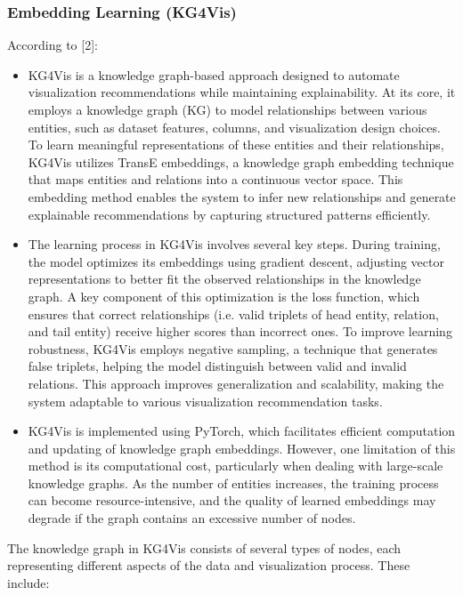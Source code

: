 \subsubsection{Embedding Learning (KG4Vis)}

According to [2]:
\begin{itemize}
\item KG4Vis is a knowledge graph-based approach designed to automate visualization recommendations while maintaining explainability. At its core, it employs a knowledge graph (KG) to model relationships between various entities, such as dataset features, columns, and visualization design choices. To learn meaningful representations of these entities and their relationships, KG4Vis utilizes TransE embeddings, a knowledge graph embedding technique that maps entities and relations into a continuous vector space. This embedding method enables the system to infer new relationships and generate explainable recommendations by capturing structured patterns efficiently.

\item The learning process in KG4Vis involves several key steps. During training, the model optimizes its embeddings using gradient descent, adjusting vector representations to better fit the observed relationships in the knowledge graph. A key component of this optimization is the loss function, which ensures that correct relationships (i.e. valid triplets of head entity, relation, and tail entity) receive higher scores than incorrect ones. To improve learning robustness, KG4Vis employs negative sampling, a technique that generates false triplets, helping the model distinguish between valid and invalid relations. This approach improves generalization and scalability, making the system adaptable to various visualization recommendation tasks.

\item KG4Vis is implemented using PyTorch, which facilitates efficient computation and updating of knowledge graph embeddings. However, one limitation of this method is its computational cost, particularly when dealing with large-scale knowledge graphs. As the number of entities increases, the training process can become resource-intensive, and the quality of learned embeddings may degrade if the graph contains an excessive number of nodes.
\end{itemize}
The knowledge graph in KG4Vis consists of several types of nodes, each representing different aspects of the data and visualization process. These include:

